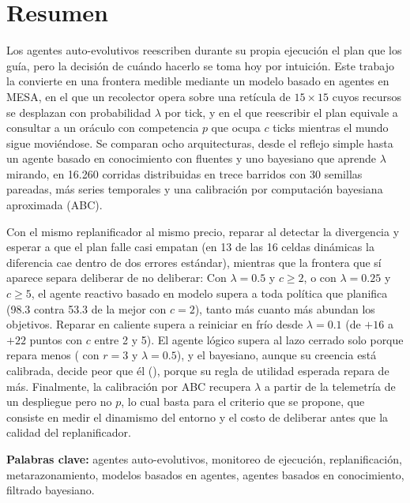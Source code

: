 \section*{Resumen}

Los agentes auto-evolutivos reescriben durante su propia ejecución el plan que los guía, pero la decisión de cuándo hacerlo se toma hoy por intuición. Este trabajo la convierte en una frontera medible mediante un modelo basado en agentes en MESA, en el que un recolector opera sobre una retícula de $15\times15$ cuyos recursos se desplazan con probabilidad $\lambda$ por tick, y en el que reescribir el plan equivale a consultar a un oráculo con competencia $p$ que ocupa $c$ ticks mientras el mundo sigue moviéndose. Se comparan ocho arquitecturas, desde el reflejo simple hasta un agente basado en conocimiento con fluentes y uno bayesiano que aprende $\lambda$ mirando, en 16.260 corridas distribuidas en trece barridos con 30 semillas pareadas, más series temporales y una calibración por computación bayesiana aproximada (ABC).

Con el mismo replanificador al mismo precio, reparar al detectar la divergencia y esperar a que el plan falle casi empatan (en 13 de las 16 celdas dinámicas la diferencia cae dentro de dos errores estándar), mientras que la frontera que sí aparece separa deliberar de no deliberar: Con $\lambda=0.5$ y $c\ge2$, o con $\lambda=0.25$ y $c\ge5$, el agente reactivo basado en modelo supera a toda política que planifica (98.3 contra 53.3 de la mejor con $c=2$), tanto más cuanto más abundan los objetivos. Reparar en caliente supera a reiniciar en frío desde $\lambda=0.1$ (de $+16$ a $+22$ puntos con $c$ entre 2 y 5). El agente lógico supera al lazo cerrado solo porque repara menos ( con $r=3$ y $\lambda=0.5$), y el bayesiano, aunque su creencia está calibrada, decide peor que él (), porque su regla de utilidad esperada repara de más. Finalmente, la calibración por ABC recupera $\lambda$ a partir de la telemetría de un despliegue pero no $p$, lo cual basta para el criterio que se propone, que consiste en medir el dinamismo del entorno y el costo de deliberar antes que la calidad del replanificador.

\medskip
\noindent\textbf{Palabras clave:} agentes auto-evolutivos, monitoreo de ejecución, replanificación, metarazonamiento, modelos basados en agentes, agentes basados en conocimiento, filtrado bayesiano.

\clearpage
{\hypersetup{linkcolor=black}\tableofcontents}
\clearpage
